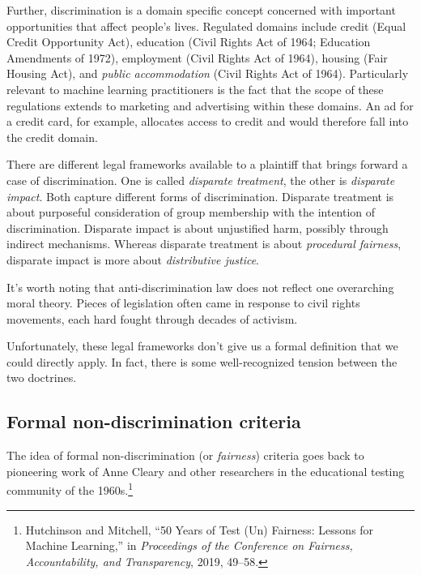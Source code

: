 \documentclass{tufte-book}
\begin{document}
Further, discrimination is a domain specific concept concerned with
important opportunities that affect people's lives. Regulated domains
include credit (Equal Credit Opportunity Act), education (Civil Rights
Act of 1964; Education Amendments of 1972), employment (Civil Rights Act
of 1964), housing (Fair Housing Act), and \emph{public accommodation}
(Civil Rights Act of 1964). Particularly relevant to machine learning
practitioners is the fact that the scope of these regulations extends to
marketing and advertising within these domains. An ad for a credit card,
for example, allocates access to credit and would therefore fall into
the credit domain.

There are different legal frameworks available to a plaintiff that
brings forward a case of discrimination. One is called \emph{disparate
treatment}, the other is \emph{disparate impact}. Both capture different
forms of discrimination. Disparate treatment is about purposeful
consideration of group membership with the intention of discrimination.
Disparate impact is about unjustified harm, possibly through indirect
mechanisms. Whereas disparate treatment is about \emph{procedural
fairness}, disparate impact is more about \emph{distributive
justice}.

It's worth noting that anti-discrimination law does not reflect one
overarching moral theory. Pieces of legislation often came in response
to civil rights movements, each hard fought through decades of activism.

Unfortunately, these legal frameworks don't give us a formal definition
that we could directly apply. In fact, there is some well-recognized
tension between the two doctrines.

\hypertarget{formal-non-discrimination-criteria}{%
\subsection{Formal non-discrimination
criteria}\label{formal-non-discrimination-criteria}}

The idea of formal non-discrimination (or \emph{fairness}) criteria goes
back to pioneering work of Anne Cleary and other researchers in the
educational testing community of the 1960s.\footnote{Hutchinson and
  Mitchell, {``50 Years of Test (Un) Fairness: Lessons for Machine
  Learning,''} in \emph{Proceedings of the Conference on Fairness,
  Accountability, and Transparency}, 2019, 49--58.}
\end{document}
